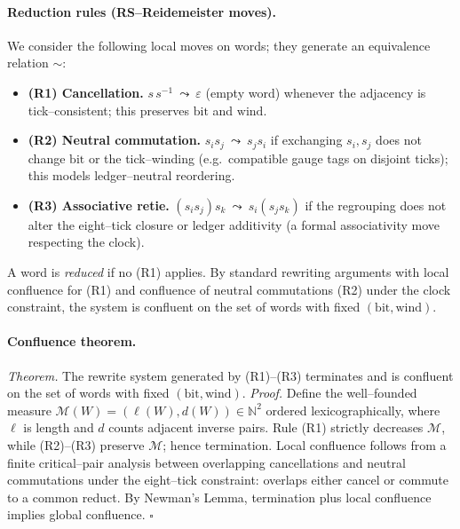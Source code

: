 \documentclass[epjc3]{svjour3}
\begin{document}
\paragraph{Reduction rules (RS–Reidemeister moves).}
We consider the following local moves on words; they generate an equivalence relation $\sim$:
\begin{itemize}
  \item \textbf{(R1) Cancellation.} $s\,s^{-1} \ \leadsto\ \varepsilon$ (empty word) whenever the adjacency is tick–consistent; this preserves $\mathrm{bit}$ and $\mathrm{wind}$.
  \item \textbf{(R2) Neutral commutation.} $s_i s_j \ \leadsto\ s_j s_i$ if exchanging $s_i,s_j$ does not change $\mathrm{bit}$ or the tick–winding (e.g.\ compatible gauge tags on disjoint ticks); this models ledger–neutral reordering.
  \item \textbf{(R3) Associative retie.} $(s_i s_j) s_k \ \leadsto\ s_i (s_j s_k)$ if the regrouping does not alter the eight–tick closure or ledger additivity (a formal associativity move respecting the clock).
\end{itemize}
A word is \emph{reduced} if no (R1) applies.  By standard rewriting arguments with local confluence for (R1) and confluence of neutral commutations (R2) under the clock constraint, the system is confluent on the set of words with fixed $(\mathrm{bit},\mathrm{wind})$.

\paragraph{Confluence theorem.}
\emph{Theorem.} The rewrite system generated by (R1)--(R3) terminates and is confluent on the set of words with fixed $(\mathrm{bit},\mathrm{wind})$.  \emph{Proof.} Define the well--founded measure $\mathcal M(W)=(\ell(W),d(W))\in\mathbb N^2$ ordered lexicographically, where $\ell$ is length and $d$ counts adjacent inverse pairs. Rule (R1) strictly decreases $\mathcal M$, while (R2)--(R3) preserve $\mathcal M$; hence termination. Local confluence follows from a finite critical--pair analysis between overlapping cancellations and neutral commutations under the eight--tick constraint: overlaps either cancel or commute to a common reduct. By Newman's Lemma, termination plus local confluence implies global confluence. $\square$
\end{document}

